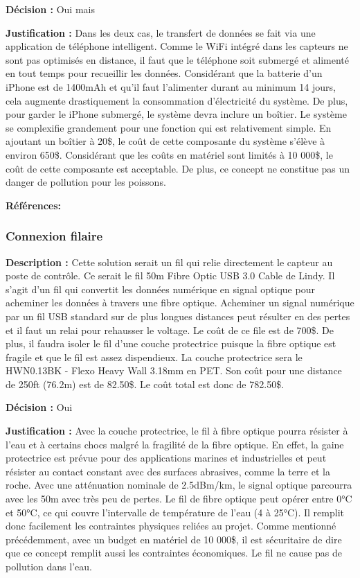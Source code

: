 \textbf{Décision :} Oui mais
 
\textbf{Justification :} Dans les deux cas, le transfert de données se fait via une application de téléphone intelligent. Comme le WiFi intégré dans les capteurs ne sont pas optimisés en distance, il faut que le téléphone soit submergé et alimenté en tout temps pour recueillir les données. Considérant que la batterie d'un iPhone est de 1400mAh et qu'il faut l'alimenter durant au minimum 14 jours, cela augmente drastiquement la consommation d'électricité du système. De plus, pour garder le iPhone submergé, le système devra inclure un boîtier. Le système se complexifie grandement pour une fonction qui est relativement simple. En ajoutant un boîtier à 20\$, le coût de cette composante du système s'élève à environ 650\$. Considérant que les coûts en matériel sont limités à 10 000\$, le coût de cette composante est acceptable. De plus, ce concept ne constitue pas un danger de pollution pour les poissons.

\textbf{Références:} \cite{GoPro_Specs} \cite{GoPro_Waterproof} \cite{GoFishCam} \cite{iPhone7}

\subsubsection{Connexion filaire}
\textbf{Description :} Cette solution serait un fil qui relie directement le capteur au poste de contrôle. Ce serait le fil 50m Fibre Optic USB 3.0 Cable de Lindy. Il s'agit d'un fil qui convertit les données numérique en signal optique pour acheminer les données à travers une fibre optique. Acheminer un signal numérique par un fil USB standard sur de plus longues distances peut résulter en des pertes et il faut un relai pour rehausser le voltage. Le coût de ce file est de 700\$. De plus, il faudra isoler le fil d'une couche protectrice puisque la fibre optique est fragile et que le fil est assez dispendieux. La couche protectrice sera le HWN0.13BK - Flexo Heavy Wall 3.18mm en PET. Son coût pour une distance de 250ft (76.2m) est de 82.50\$. Le coût total est donc de 782.50\$.
 
\textbf{Décision :} Oui
 
\textbf{Justification :} Avec la couche protectrice, le fil à fibre optique pourra résister à l'eau et à certains chocs malgré la fragilité de la fibre optique. En effet, la gaine protectrice est prévue pour des applications marines et industrielles et peut résister au contact constant avec des surfaces abrasives, comme la terre et la roche. Avec une atténuation nominale de 2.5dBm/km, le signal optique parcourra avec les 50m avec très peu de pertes. Le fil de fibre optique peut opérer entre 0°C et 50°C, ce qui couvre l'intervalle de température de l'eau (4 à 25°C). Il remplit donc facilement les contraintes physiques reliées au projet. Comme mentionné précédemment, avec un budget en matériel de 10 000\$, il est sécuritaire de dire que ce concept remplit aussi les contraintes économiques. Le fil ne cause pas de pollution dans l'eau.

